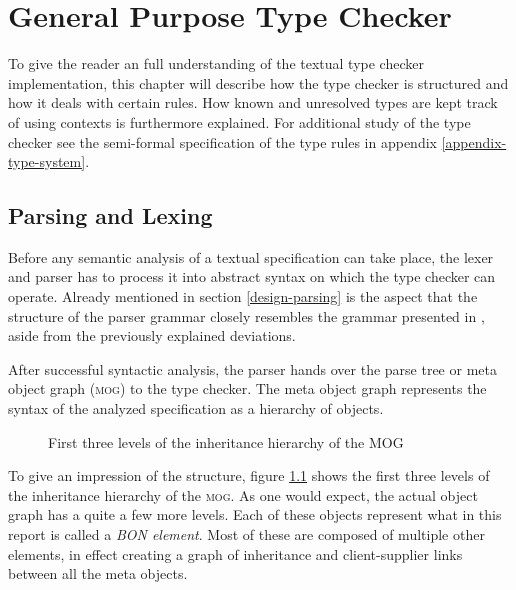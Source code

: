 \chapter{General Purpose Type Checker}
To give the reader an full understanding of the textual \bon{} type checker implementation, this chapter will describe how the type checker is structured and how it deals with certain rules. How known and unresolved types are kept track of using contexts is furthermore explained. For additional study of the type checker see the semi-formal specification of the type rules in appendix \ref{appendix-type-system}.
\section{Parsing and Lexing}
\label{implementation-parser}
Before any semantic analysis of a textual \bon{} specification can take place, the lexer and parser has to process it into abstract syntax on which the type checker can operate. Already mentioned in section \ref{design-parsing} is the aspect that the structure of the parser grammar closely resembles the grammar presented in \cite[pp.~352-359]{walden1995}, aside from the previously explained deviations.

After successful syntactic analysis, the parser hands over the parse tree or meta object graph (\textsc{mog}) to the type checker. The meta object graph represents the syntax of the analyzed specification as a hierarchy of objects.
\begin{figure}[H]
    \centerline{}
    \caption[MOG hierarchy]{First three levels of the inheritance hierarchy of the MOG}
    \label{fig:mog-hierarchy}
\end{figure}
To give an impression of the structure, figure \ref{fig:mog-hierarchy} shows the first three levels of the inheritance hierarchy of the \textsc{mog}. As one would expect, the actual object graph has a quite a few more levels. Each of these objects represent what in this report is called a \textit{BON element}. Most of these are composed of multiple other \bon{} elements, in effect creating a graph of inheritance and client-supplier links between all the meta objects.

